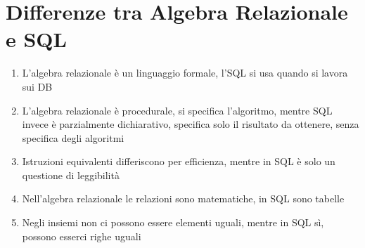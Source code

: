 \documentclass[12pt, a4paper, openany, twoside]{book}
\begin{document}
\section{Differenze tra Algebra Relazionale e SQL}
\begin{enumerate}
	\item L'algebra relazionale è un linguaggio formale, l'SQL si usa quando si 
	lavora sui DB
	\item L'algebra relazionale è procedurale, si specifica l'algoritmo, mentre
	SQL invece è parzialmente dichiarativo, specifica solo il risultato da 
	ottenere, senza specifica degli algoritmi
	\item Istruzioni equivalenti differiscono per efficienza, mentre in SQL è 
	solo un questione di leggibilità
	\item Nell'algebra relazionale le relazioni sono matematiche, in SQL sono 
	tabelle
	\item Negli insiemi non ci possono essere elementi uguali, mentre in SQL sì,
	possono esserci righe uguali
\end{enumerate}
\end{document}
